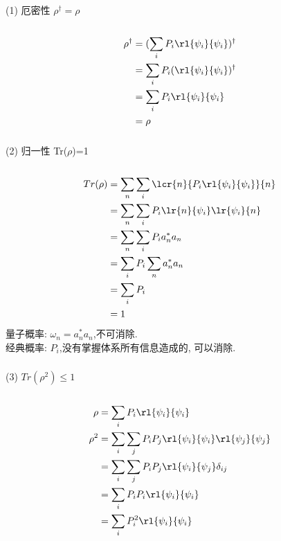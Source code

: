  \begin{frame} 
     \frametitle{}
      (1) 厄密性 $\rho ^{\dagger} = \rho$  \\ 
    \证~ 
    \[ \begin{aligned}
        \rho ^{\dagger} &= (\sum_i P_i\rl{\psi_i}{\psi_i} )^{\dagger} \\
        &= \sum_i P_i(\rl{\psi_i}{\psi_i} )^{\dagger} \\
        &= \sum_i P_i\rl{\psi_i}{\psi_i}  \\
        &= \rho
    \end{aligned}\] 
\end{frame}

\begin{frame} 
 \frametitle{}
      (2) 归一性 Tr($\rho$)=1 \\ 
      \证~
      \[ \begin{aligned}
        Tr(\rho) &= \sum_n \sum_i \lcr{n}{P_i\rl{\psi_i}{\psi_i}}{n} \\
        &= \sum_n \sum_i P_i \lr{n}{\psi_i} \lr{\psi_i}{n}  \\
        &= \sum_n \sum_i P_i a_n^* a_n \\ 
        &= \sum_i P_i \sum_n a_n^* a_n \\ 
        &= \sum_i P_i \\ 
        &=1
      \end{aligned}\] 
      量子概率: $\omega_n= a_n^* a_n$,不可消除.\\ 
      经典概率: $P_i$,没有掌握体系所有信息造成的, 可以消除.
\end{frame}

\begin{frame} 
 \frametitle{}
      (3)  $Tr(\rho^2)\leq 1$  \\ 
      \证~
      \[ \begin{aligned}
        \rho & = \sum_i P_i\rl{\psi_i}{\psi_i} \\ 
        \rho^2 & = \sum_i\sum_j P_iP_j\rl{\psi_i}{\psi_i} \rl{\psi_j}{\psi_j} \\ 
        &= \sum_i\sum_j P_iP_j\rl{\psi_i}{\psi_j} \delta_{ij} \\ 
        &= \sum_i P_iP_i\rl{\psi_i}{\psi_i}  \\
        &=\sum_i P^2_i \rl{\psi_i}{\psi_i} 
    \end{aligned}\] 
    \end{frame}
    
